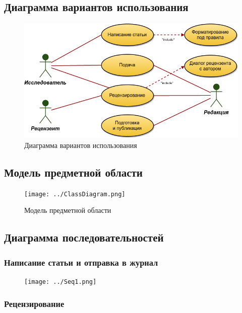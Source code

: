 \subsection{Диаграмма вариантов использования}

\begin{figure}[H]
\centering
\includegraphics[width=\textwidth]{../UseCases.png}
\caption{Диаграмма вариантов использования}
\end{figure}

\subsection{Модель предметной области}

\begin{figure}[H]
\centering
\texttt{[image: ../ClassDiagram.png]}
\caption{Модель предметной области}
\end{figure}

\subsection{Диаграмма последовательностей}

\subsubsection{Написание статьи и отправка в
журнал}

\begin{figure}[H]
\centering
\texttt{[image: ../Seq1.png]}
\caption{}
\end{figure}

\subsubsection{Рецензирование}

